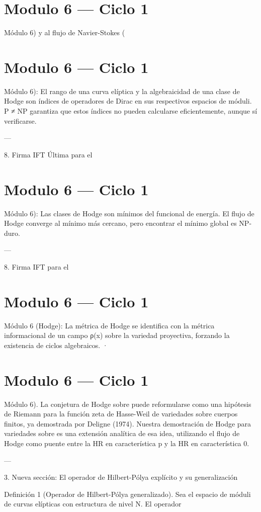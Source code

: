 \documentclass[12pt,twoside]{book}
\begin{document}
\chapter{Modulo 6 — Ciclo 1}
Módulo 6) y al flujo de Navier-Stokes (

\chapter{Modulo 6 — Ciclo 1}
Módulo 6): El rango de una curva elíptica y la algebraicidad de una clase de Hodge son índices de operadores de Dirac en sus respectivos espacios de móduli. P ≠ NP garantiza que estos índices no pueden calcularse eficientemente, aunque sí verificarse.

---

8. Firma IFT Última para el 

\chapter{Modulo 6 — Ciclo 1}
Módulo 6): Las clases de Hodge son mínimos del funcional de energía. El flujo de Hodge converge al mínimo más cercano, pero encontrar el mínimo global es NP-duro.

---

8. Firma IFT para el 

\chapter{Modulo 6 — Ciclo 1}
Módulo 6 (Hodge): La métrica de Hodge se identifica con la métrica informacional de un campo ρ(x) sobre la variedad proyectiva, forzando la existencia de ciclos algebraicos.
· 

\chapter{Modulo 6 — Ciclo 1}
Módulo 6).
La conjetura de Hodge sobre  puede reformularse como una hipótesis de Riemann para la función zeta de Hasse-Weil de variedades sobre cuerpos finitos, ya demostrada por Deligne (1974). Nuestra demostración de Hodge para variedades sobre  es una extensión analítica de esa idea, utilizando el flujo de Hodge como puente entre la HR en característica p y la HR en característica 0.

---

3. Nueva sección: El operador de Hilbert-Pólya explícito y su generalización

Definición 1 (Operador de Hilbert-Pólya generalizado). Sea  el espacio de móduli de curvas elípticas con estructura de nivel N. El operador
\end{document}

